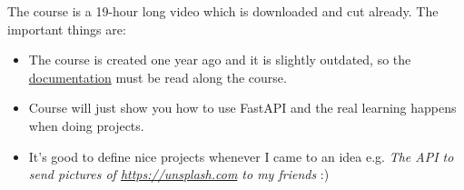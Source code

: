 		\noindent The course is a 19-hour long video which is downloaded and cut already. The important things are:
		\begin{itemize}
			\item The course is created one year ago and it is slightly outdated, so the \href{https://fastapi.tiangolo.com}{documentation} must be read along the course.
			
			\item Course will just show you how to use FastAPI and the real learning happens when doing projects.
			
			\item It's good to define nice projects whenever I came to an idea
			e.g. \textit{The API to send pictures of \url{https://unsplash.com} to my friends} :)
		\end{itemize}
		
		

